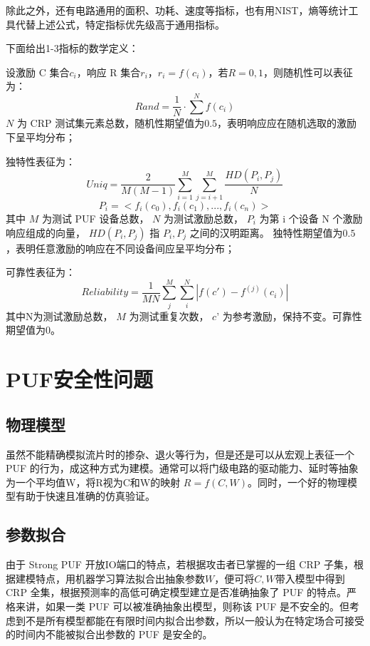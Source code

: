 除此之外，还有电路通用的面积、功耗、速度等指标，也有用NIST，熵等统计工具代替上述公式\supercite{van2013bias,koeberl2014entropy}，特定指标优先级高于通用指标。

下面给出1-3指标的数学定义：

设激励 C 集合$ {c_i} $，响应 R 集合$ {r_i} $，$ r_i=f(c_i) $，若$ R={0,1} $，则随机性可以表征为：
\begin{equation}\label{eq:metric-rand}
Rand=\frac{1}{N}\cdot\sum^{N}f(c_i)
\end{equation}
$ N $ 为 CRP 测试集元素总数，随机性期望值为$ 0.5 $，表明响应应在随机选取的激励下呈平均分布；

独特性表征为：
\begin{equation}\label{eq:metric-uniq}
Uniq=\dfrac{2}{M(M-1)}\sum_{i=1}^{M}\sum_{j=i+1}^{M}\frac{HD(P_i,P_j)}{N}
\end{equation}
\begin{equation}\label{eq:metric-uniq2}
P_i=<f_i(c_0),f_i(c_1),...,f_i(c_n)>
\end{equation}
其中 $ M $ 为测试 PUF 设备总数， $ N $ 为测试激励总数， $ P_i $ 为第 i 个设备 N 个激励响应组成的向量， $ HD(P_i,P_j) $ 指 $ P_i,P_j $ 之间的汉明距离。
独特性期望值为$ 0.5 $，表明任意激励的响应在不同设备间应呈平均分布；

可靠性表征为：
\begin{equation}\label{eq:reliability}
Reliability=\dfrac{1}{MN}\sum_{j}^{M}\sum_{i}^{N}|f(c')-f^{(j)}(c_i)|
\end{equation}
其中N为测试激励总数， $ M $ 为测试重复次数， $ c’ $ 为参考激励，保持不变。可靠性期望值为0。


\section{PUF安全性问题}\label{sec:puf_security}

\subsection{物理模型}
虽然不能精确模拟流片时的掺杂、退火等行为，但是还是可以从宏观上表征一个 PUF 的行为，成这种方式为建模。通常可以将门级电路的驱动能力、延时等抽象为一个平均值W，将R视为C和W的映射 $ R=f(C,W) $。同时，一个好的物理模型有助于快速且准确的仿真验证。

\subsection{参数拟合}
由于 Strong PUF 开放IO端口的特点，若根据攻击者已掌握的一组 CRP 子集，根据建模特点，用机器学习算法拟合出抽象参数$ W $，便可将$ C,W $带入模型中得到 CRP 全集，根据预测率的高低可确定模型建立是否准确抽象了 PUF 的特点。严格来讲，如果一类 PUF 可以被准确抽象出模型，则称该 PUF 是不安全的。但考虑到不是所有模型都能在有限时间内拟合出参数，所以一般认为在特定场合可接受的时间内不能被拟合出参数的 PUF 是安全的。

